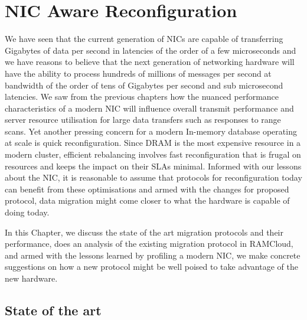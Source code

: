 
\chapter{NIC Aware Reconfiguration}
\label{chap:migration}
We have seen that the current generation of NICs are capable of transferring Gigabytes of 
data per second in latencies of the order of a few microseconds and we have reasons to believe 
that the next generation of networking hardware will have the ability to process 
hundreds of millions of messages per second at bandwidth of the order of tens of Gigabytes per 
second and sub microsecond latencies\cite{cx6}.
We saw from the previous chapters how the nuanced performance characteristics of 
a modern NIC will influence overall transmit performance and server resource utilisation 
for large data transfers such as responses to range scans. Yet another pressing 
concern for a modern In-memory database operating at scale is quick reconfiguration. 
Since DRAM is the most expensive resource in a modern cluster, efficient rebalancing 
involves fast reconfiguration that is frugal on resources and keeps the impact on their 
SLAs minimal. Informed with our lessons about the NIC, it is reasonable to assume that protocols for reconfiguration 
today can benefit from these optimisations and armed with the changes for proposed protocol, data migration might come 
closer to what the hardware is capable of doing today.

In this Chapter, we discuss the state of the art migration protocols and their 
performance, does an analysis of the existing migration protocol in RAMCloud, 
and armed with the lessons learned by profiling a modern NIC, we make concrete 
suggestions on how a new protocol might be well poised to take advantage of the 
new hardware.


\section{State of the art}


